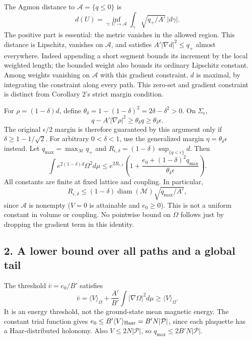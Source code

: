 \documentclass[11pt,a4paper]{article}
\begin{document}
The Agmon distance to \(\mathcal A=\{q\le0\}\) is
\[d(U)=\inf_{\gamma:\,U\to\mathcal A}
\int_\gamma\sqrt{q_+/A'}\,|d\gamma|.\] The positive part is essential:
the metric vanishes in the allowed region. This distance is Lipschitz,
vanishes on \(\mathcal A\), and satisfies \(A'|\nabla d|^2\le q_+\)
almost everywhere. Indeed appending a short segment bounds its increment
by the local weighted length; the bounded weight also bounds its
ordinary Lipschitz constant. Among weights vanishing on \(\mathcal A\)
with this gradient constraint, \(d\) is maximal, by integrating the
constraint along every path. This zero-set and gradient constraint is
distinct from Corollary 2's strict margin condition.

For \(\rho=(1-\delta)d\), define
\(\theta_\delta=1-(1-\delta)^2=2\delta-\delta^2>0\). On
\(\Sigma_\epsilon\),
\[q-A'|\nabla\rho|^2\ge\theta_\delta q\ge\theta_\delta\epsilon.\] The
original \(\epsilon/2\) margin is therefore guaranteed by this argument
only if \(\delta\ge1-1/\sqrt2\). For arbitrary \(0<\delta<1\), use the
generalized margin \(\eta=\theta_\delta\epsilon\) instead. Let
\(q_{\max}=\max_{\mathcal M}q_+\) and
\(R_{\epsilon,\delta}=(1-\delta)\sup_{\{q<\epsilon\}}d\). Then
\[\int e^{2(1-\delta)d}\Omega^2d\mu
\le e^{2R_{\epsilon,\delta}}
\left(1+\frac{e_0+(1-\delta)^2q_{\max}}
{\theta_\delta\epsilon}\right).\] All constants are finite at fixed
lattice and coupling. In particular,
\[R_{\epsilon,\delta}\le(1-\delta)\operatorname{diam}(\mathcal M)
\sqrt{q_{\max}/A'},\] since \(\mathcal A\) is nonempty (\(V=0\) is
attainable and \(e_0\ge0\)). This is not a uniform constant in volume or
coupling. No pointwise bound on \(\Omega\) follows just by dropping the
gradient term in this identity.

\hypertarget{a-lower-bound-over-all-paths-and-a-global-tail}{%
\subsection{2. A lower bound over all paths and a global
tail}\label{a-lower-bound-over-all-paths-and-a-global-tail}}

The threshold \(\bar v=e_0/B'\) satisfies
\[\bar v=\langle V\rangle_\Omega+
\frac{A'}{B'}\int|\nabla\Omega|^2d\mu\ge\langle V\rangle_\Omega.\] It is
an energy threshold, not the ground-state mean magnetic energy. The
constant trial function gives
\(e_0\le B'\langle V\rangle_{\rm Haar}=B'N|\mathcal P|\), since each
plaquette has a Haar-distributed holonomy. Also \(V\le2N|\mathcal P|\),
so \(q_{\max}\le2B'N|\mathcal P|\).
\end{document}
